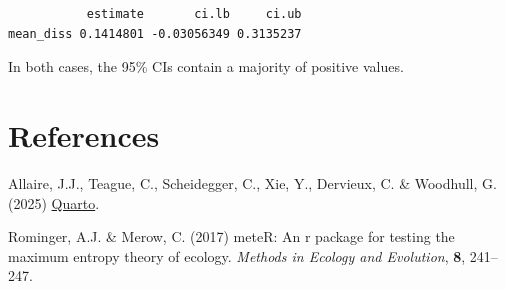 \documentclass[
  letterpaper,
  DIV=11,
  numbers=noendperiod]{scrartcl}
\newlength{\cslhangindent}
\newenvironment{CSLReferences}[2] %
 {\begin{list}{}{%
  \setlength{\itemindent}{0pt}
  \setlength{\leftmargin}{0pt}
  \setlength{\parsep}{0pt}
  \ifodd #1
   \setlength{\leftmargin}{\cslhangindent}
   \setlength{\itemindent}{-1\cslhangindent}
  \fi
  \setlength{\itemsep}{#2\baselineskip}}}
 {\end{list}}
\begin{document}
\begin{verbatim}
           estimate       ci.lb     ci.ub
mean_diss 0.1414801 -0.03056349 0.3135237
\end{verbatim}

In both cases, the 95\% CIs contain a majority of positive values.

\section*{References}\label{references}

\label{refs}
\begin{CSLReferences}{1}{0}
Allaire, J.J., Teague, C., Scheidegger, C., Xie, Y., Dervieux, C. \&
Woodhull, G. (2025)
\href{https://github.com/quarto-dev/quarto-cli}{{Quarto}}.

Rominger, A.J. \& Merow, C. (2017) meteR: An r package for testing the
maximum entropy theory of ecology. \emph{Methods in Ecology and
Evolution}, \textbf{8}, 241--247.

\end{CSLReferences}
\end{document}
